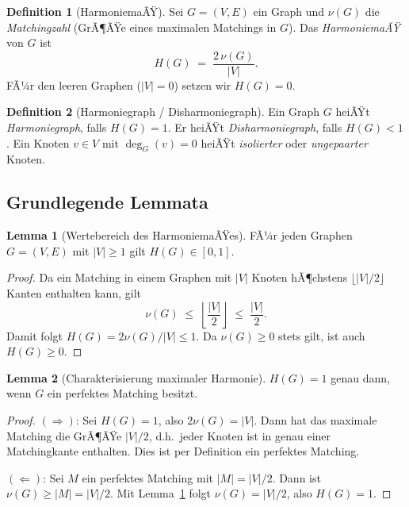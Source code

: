 ﻿\documentclass[a4paper,12pt]{article}
\theoremstyle{definition}
\newtheorem{definition}{Definition}
\newtheorem{lemma}{Lemma}
\begin{document}
\begin{definition}[HarmoniemaÃŸ]
	\label{def:harmoniemass}
	Sei $G = (V, E)$ ein Graph und $\nu(G)$ die \emph{Matchingzahl} (GrÃ¶ÃŸe eines
	maximalen Matchings in $G$). Das \emph{HarmoniemaÃŸ} von $G$ ist
	\[
		H(G) \;=\; \frac{2\,\nu(G)}{|V|}.
	\]
	FÃ¼r den leeren Graphen ($|V| = 0$) setzen wir $H(G) = 0$.
\end{definition}

\begin{definition}[Harmoniegraph / Disharmoniegraph]
	Ein Graph $G$ heiÃŸt \emph{Harmoniegraph}, falls $H(G) = 1$.
	Er heiÃŸt \emph{Disharmoniegraph}, falls $H(G) < 1$.
	Ein Knoten $v \in V$ mit $\deg_G(v) = 0$ heiÃŸt \emph{isolierter} oder
	\emph{ungepaarter} Knoten.
\end{definition}

\subsection{Grundlegende Lemmata}

\begin{lemma}[Wertebereich des HarmoniemaÃŸes]
	\label{lem:bereich}
	FÃ¼r jeden Graphen $G = (V, E)$ mit $|V| \geq 1$ gilt $H(G) \in [0, 1]$.
\end{lemma}

\begin{proof}
	Da ein Matching in einem Graphen mit $|V|$ Knoten hÃ¶chstens $\lfloor |V|/2 \rfloor$
	Kanten enthalten kann, gilt
	\[
		\nu(G) \;\leq\; \left\lfloor \frac{|V|}{2} \right\rfloor \;\leq\; \frac{|V|}{2}.
	\]
	Damit folgt $H(G) = 2\nu(G)/|V| \leq 1$.
	Da $\nu(G) \geq 0$ stets gilt, ist auch $H(G) \geq 0$.
\end{proof}

\begin{lemma}[Charakterisierung maximaler Harmonie]
	\label{lem:perfekt}
	$H(G) = 1$ genau dann, wenn $G$ ein perfektes Matching besitzt.
\end{lemma}

\begin{proof}
	$(\Rightarrow)$: Sei $H(G) = 1$, also $2\nu(G) = |V|$. Dann hat das maximale
	Matching die GrÃ¶ÃŸe $|V|/2$, d.h.\ jeder Knoten ist in genau einer Matchingkante
	enthalten. Dies ist per Definition ein perfektes Matching.
	
	$(\Leftarrow)$: Sei $M$ ein perfektes Matching mit $|M| = |V|/2$. Dann ist
	$\nu(G) \geq |M| = |V|/2$. Mit Lemma~\ref{lem:bereich} folgt $\nu(G) = |V|/2$,
	also $H(G) = 1$.
\end{proof}
\end{document}
